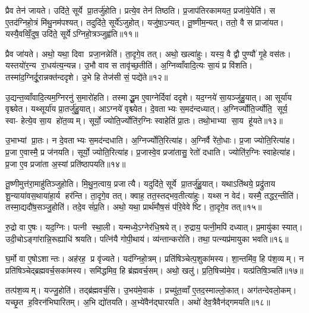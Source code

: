 प्रैव तेन॑ जायते। उदि॑ते॒ सूर्ये प्रा॒तर्जु॑होति। प्रत्ये॒व तेन॑ तिष्ठति। प्र॒जाप॑तिरकामयत॒ प्रजा॑ये॒येति॑। स ए॒तद॑ग्निहो॒त्रं मि॑थु॒नम॑पश्यत्। तदुदि॑ते॒ सूर्ये॑ऽजुहोत्। यजु॑षा॒ऽन्यत्। तू॒ष्णीम॒न्यत्। ततो॒ वै स प्राजा॑यत। यस्यै॒वव्विँ॒दुष॒ उदि॑ते॒ सूर्येऽग्निहो॒त्रञ्जुह्व॑ति॥११॥

प्रैव जा॑यते। अथो॒ यथा॒ दिवा प्रजा॒नन्नेति॑। ता॒दृगे॒व तत्। अथो॒ खल्वा॑हुः। यस्य॒ वै द्वौ पुण्यौ॑ गृ॒हे वस॑तः। यस्तयो॑र॒न्य रा॒धय॑त्य॒न्यन्न। उ॒भौ वाव स तावृ॑च्छ॒तीति॑। अ॒ग्निव्वाँवादि॒त्यः सा॒यं प्र वि॑शति। तस्मा॑द॒ग्निर्दू॒रान्नक्त॑न्ददृशे। उ॒भे हि तेज॑सी सं॒ पद्ये॑ते॥१२॥

उ॒द्यन्त॒व्वाँवादि॒त्यम॒ग्निरनु॑ स॒मारो॑हति। तस्माद्धू॒म ए॒वाग्नेर्दिवा॑ ददृशे। यद॒ग्नये॑ सा॒यञ्जु॑हु॒यात्। आ सूर्या॑य वृश्च्येत। यथ्सूर्या॑य प्रा॒तर्जु॑हु॒यात्। आऽग्नये॑ वृश्च्येत। दे॒वताभ्यः स॒मद॑न्दध्यात्। अ॒ग्निर्ज्योति॒र्ज्योति॒ सूर्य॒ स्वा- हेत्ये॒व सा॒य हो॑त॒व्यम्। सूर्यो॒ ज्योति॒र्ज्योति॑र॒ग्निः स्वाहेति॑ प्रा॒तः। तथो॒भाभ्या सा॒य हू॑यते॥१३॥

उ॒भाभ्यां प्रा॒तः। न दे॒वताभ्यः स॒मद॑न्दधाति। अ॒ग्निर्ज्योति॒रित्या॑ह। अ॒ग्निर्वै रे॑तो॒धाः। प्र॒जा ज्योति॒रित्या॑ह। प्र॒जा ए॒वास्मै॒ प्र ज॑नयति। सूर्यो॒ ज्योति॒रित्या॑ह। प्र॒जास्वे॒व प्रजा॑तासु॒ रेतो॑ दधाति। ज्योति॑र॒ग्निः स्वाहेत्या॑ह। प्र॒जा ए॒व प्रजा॑ता अ॒स्यां प्रति॑ष्ठापयति॥१४॥

तू॒ष्णीमुत्त॑रा॒माहु॑तिञ्जुहोति। मि॒थु॒न॒त्वाय॒ प्रजात्यै। यदुदि॑ते॒ सूर्ये प्रा॒तर्जु॑हु॒यात्। यथाऽति॑थये॒ प्रद्रु॑ताय शू॒न्याया॑वस॒थाया॑हा॒र्य हर॑न्ति। ता॒दृगे॒व तत्। क्वाह॒ तत॒स्तद्भव॒तीत्या॑हुः। यथ्स न वेद॑। यस्मै॒ तद्धर॒न्तीति॑। तस्मा॒द्यदौ॑ष॒सञ्जु॒होति॑। तदे॒व सं॑प्र॒ति। अथो॒ यथा॒ प्रार्थ॑मौष॒सं प॑रि॒वेवेष्टि। ता॒दृगे॒व तत्॥१५॥\anuvakamend[अ॒मृ॒ष्ट॒ वि॒चि॒किथ्स॑ति॒ जुह्व॑त्य॒जाम॑सृजताग्निहो॒त्र सूर्या॑य प्रा॒तर्जु॒होति॒ जुह्व॑ति सं॒पद्ये॑ते हूयते स्थापयति संप्र॒ति द्वे च॑]

रु॒द्रो वा ए॒षः। यद॒ग्निः। पत्नी स्था॒ली। यन्मध्ये॒ऽग्नेर॑धि॒श्रयेत्। रु॒द्राय॒ पत्नी॒मपि॑ दध्यात्। प्र॒मायु॑का स्यात्। उदी॒चोऽङ्गा॑रान्नि॒रूह्याधि॑ श्रयति। पत्नि॑यै गोपी॒थाय॑। व्य॑न्तान्करोति। तथा॒ पत्न्यप्र॑मायुका भवति॥१६॥

घ॒र्मो वा ए॒षोऽशान्तः। अह॑रह॒ प्र वृ॑ज्यते। यद॑ग्निहो॒त्रम्। प्रति॑षिञ्चेत्प॒शुका॑मस्य। शा॒न्तमि॑व॒ हि प॑श॒व्यम्। न प्रति॑षिञ्चेद्ब्रह्मवर्च॒सका॑मस्य। समि॑द्धमिव॒ हि ब्र॑ह्मवर्च॒सम्। अथो॒ खलु॑। प्र॒ति॒षिच्य॑मे॒व। यत्प्र॑तिषि॒ञ्चति॑॥१७॥

तत्प॑श॒व्यम्। यज्जु॒होति॑। तद्ब्र॑ह्मवर्च॒सि। उ॒भय॑मे॒वाक॑। प्रच्यु॑त॒व्वाँ ए॒तद॒स्माल्लो॒कात्। अग॑तन्देवलो॒कम्। यच्छृ॒त ह॒विरन॑भिघारितम्। अ॒भि द्यो॑तयति। अ॒भ्ये॑वैन॑द्घारयति। अथो॑ देव॒त्रैवैन॑द्गमयति॥१८॥

